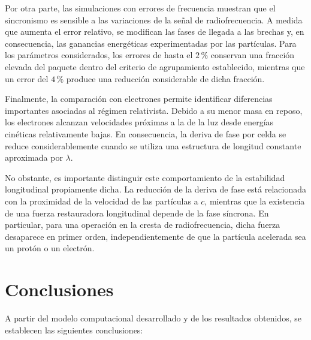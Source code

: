 Por otra parte, las simulaciones con errores de frecuencia muestran que el sincronismo es sensible a las variaciones de la señal de radiofrecuencia. A medida que aumenta el error relativo, se modifican las fases de llegada a las brechas y, en consecuencia, las ganancias energéticas experimentadas por las partículas. Para los parámetros considerados, los errores de hasta el $2\,\%$ conservan una fracción elevada del paquete dentro del criterio de agrupamiento establecido, mientras que un error del $4\,\%$ produce una reducción considerable de dicha fracción.

Finalmente, la comparación con electrones permite identificar diferencias importantes asociadas al régimen relativista. Debido a su menor masa en reposo, los electrones alcanzan velocidades próximas a la de la luz desde energías cinéticas relativamente bajas. En consecuencia, la deriva de fase por celda se reduce considerablemente cuando se utiliza una estructura de longitud constante aproximada por $\lambda$.

No obstante, es importante distinguir este comportamiento de la estabilidad longitudinal propiamente dicha. La reducción de la deriva de fase está relacionada con la proximidad de la velocidad de las partículas a $c$, mientras que la existencia de una fuerza restauradora longitudinal depende de la fase síncrona. En particular, para una operación en la cresta de radiofrecuencia, dicha fuerza desaparece en primer orden, independientemente de que la partícula acelerada sea un protón o un electrón.

\section{Conclusiones}

A partir del modelo computacional desarrollado y de los resultados obtenidos, se establecen las siguientes conclusiones:

